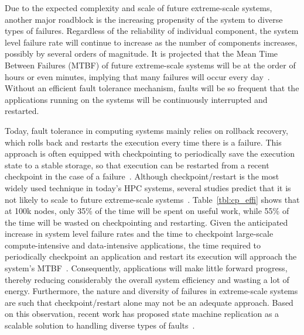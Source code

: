 
Due to the expected complexity and scale of future extreme-scale systems, another major roadblock is the increasing propensity of the system to diverse types of failures. 
Regardless of the reliability of individual component, the system level failure rate will continue to increase as the number of 
components increases, possibly by several orders of magnitude. It is projected that the Mean Time Between Failures (MTBF) of future extreme-scale systems will be at the order of hours or even minutes, implying 
that many failures will occur every day~\cite{Bergman08exascalecomputing}. Without an efficient fault tolerance mechanism, faults will be so frequent that the applications running on the 
systems will be continuously interrupted and restarted.%

Today, fault tolerance in computing systems mainly relies on rollback recovery, which rolls back and restarts the execution 
every time there is a failure. This approach is often equipped with checkpointing to periodically save the execution state to a 
stable storage, so that execution can be restarted from a recent checkpoint in the case of a failure~\cite{Elnozahy:02:Survey,kalaiselvi_sadhana_2000,chandy_trans_1985}. 
Although checkpoint/restart is the most widely used technique in today's HPC systems, several studies predict that it is not likely to scale to future extreme-scale systems~\cite{ferreira_sc_2011,elnozahy_dsc_2004,4367962}. 
Table~\ref{tbl:cp_effi} shows that at 100k nodes, only 35\% of the time will be spent on useful work, while 55\% of the time will be wasted on checkpointing and restarting. 
Given the anticipated increase in system level failure rates and the time to checkpoint large-scale 
compute-intensive and data-intensive applications, the time required to periodically checkpoint an application 
and restart its execution will approach the system's MTBF~\cite{Cappello:2009:TER:1640402.1640428}. Consequently, applications will make little forward progress, thereby 
reducing considerably the overall system efficiency and wasting a lot of energy. Furthermore, the nature and diversity of failures in extreme-scale systems are such that checkpoint/restart alone may not be an adequate approach. Based on this observation, recent work has proposed state machine replication as a scalable solution to handling diverse types of faults~\cite{fiala_2012_sdc,ferreira_sc_2011}. 

